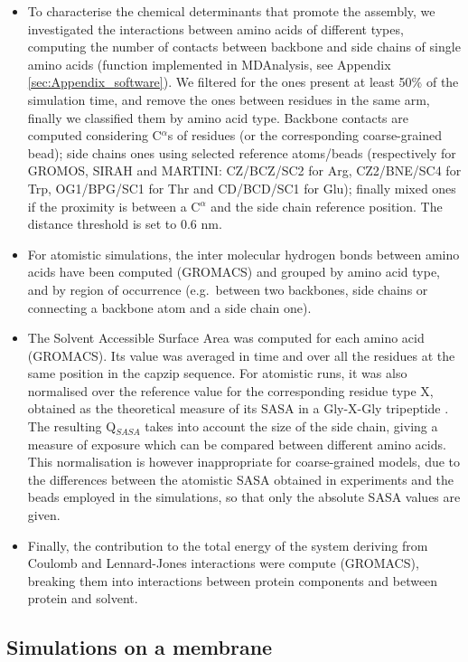 \begin{itemize}
\item To characterise the chemical determinants that promote the assembly, we investigated the interactions between amino acids of different types, computing the number of contacts between backbone and side chains of single amino acids (function implemented in MDAnalysis, see Appendix \ref{sec:Appendix_software}). We filtered for the ones present at least 50\% of the simulation time, and remove the ones between residues in the same arm, finally we classified them by amino acid type.
%
Backbone contacts are computed considering C$^\alpha$s of residues (or the corresponding coarse-grained bead); side chains ones using selected reference atoms/beads (respectively for GROMOS, SIRAH and MARTINI: CZ/BCZ/SC2 for Arg, CZ2/BNE/SC4 for Trp, OG1/BPG/SC1 for Thr and CD/BCD/SC1 for Glu); finally mixed ones if the proximity is between a C$^\alpha$ and the side chain reference position. The distance threshold is set to 0.6 nm.

\item For atomistic simulations, the inter molecular hydrogen bonds between amino acids have been computed (GROMACS) and grouped by amino acid type, and by region of occurrence (e.g.\ between two backbones, side chains or connecting a backbone atom and a side chain one).

\item The Solvent Accessible Surface Area was computed for each amino acid (GROMACS). Its value was averaged in time and over all the residues at the same position in the capzip sequence. For atomistic runs, it was also normalised over the reference value for the corresponding residue type X, obtained as the theoretical measure of its SASA in a Gly-X-Gly tripeptide \citep{Tien2013}. The resulting Q$_{SASA}$ takes into account the size of the side chain, giving a measure of exposure which can be compared between different amino acids. 
%
This normalisation is however inappropriate for coarse-grained models, due to the differences between the atomistic SASA obtained in experiments and the beads employed in the simulations, so that only the absolute SASA values are given.

\item Finally, the contribution to the total energy of the system deriving from Coulomb and Lennard-Jones interactions were compute (GROMACS), breaking them into interactions between protein components and between protein and solvent.
\end{itemize}

\subsection{Simulations on a membrane}

